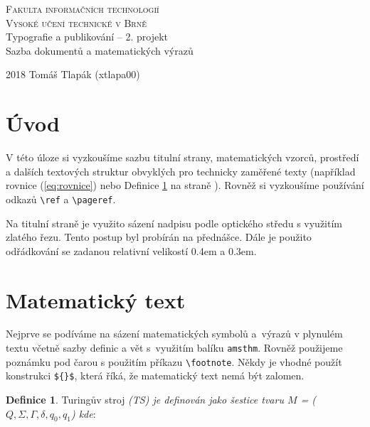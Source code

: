 \documentclass[11pt, a4paper, twocolumn]{article}
\theoremstyle{definition}
\newtheorem{definition}{Definice}
\begin{document}
\begin{titlepage}
    \begin{center}
    	{\textsc{\Huge Fakulta informačních technologií\\[0,4em]
    	Vysoké učení technické v Brně}}\\
    	{\LARGE Typografie a publikování – 2. projekt\\[0,3em]
		Sazba dokumentů a matematických výrazů}
    \end{center}
	\LARGE 2018 \hfill Tomáš Tlapák (xtlapa00)
\end{titlepage}

\section*{Úvod}
V této úloze si vyzkoušíme sazbu titulní strany, matematických
vzorců, prostředí a dalších textových struktur obvyklých
pro technicky zaměřené texty (například rovnice (\ref{eq:rovnice})
nebo Definice \ref{def:definice} na straně \pageref{def:definice}). Rovněž si vyzkoušíme používání odkazů \verb|\ref| a \verb|\pageref|. \par

Na titulní straně je využito sázení nadpisu podle optického středu s využitím zlatého řezu. Tento postup byl
probírán na přednášce. Dále je použito odřádkování se
zadanou relativní velikostí 0.4em a 0.3em. \par

\section{Matematický text}

Nejprve se podíváme na sázení matematických symbolů
a~výrazů v plynulém textu včetně sazby definic a vět s~využitím
balíku \verb|amsthm|. Rovněž použijeme poznámku pod
čarou s použitím příkazu \verb|\footnote|. Někdy je vhodné
použít konstrukci \verb|${}$|, která říká, že matematický text
nemá být zalomen. \par

\begin{definition}\label{def:definice}
Turingův stroj \emph{(TS) je definován jako šestice tvaru $M$ = ($Q, \Sigma, \Gamma, \delta, q_0, q_1$) kde}:
\end{definition}
\end{document}
